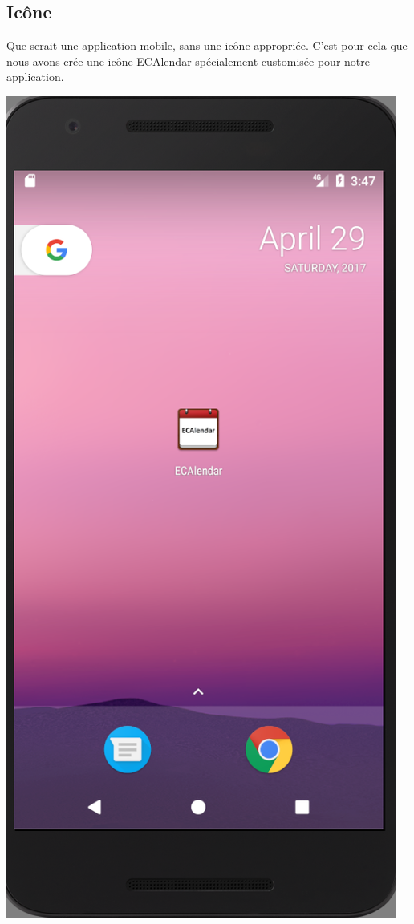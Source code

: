 \documentclass{article}
\begin{document}
	\subsection{Icône}
	 Que serait une application mobile, sans une icône appropri\'ee. C'est pour cela que nous avons cr\'ee une icône ECAlendar spécialement customis\'ee pour notre application.
	   \begin{center}
            \includegraphics[scale=0.4]{img/ICON.png}
        \end{center}
\end{document}
